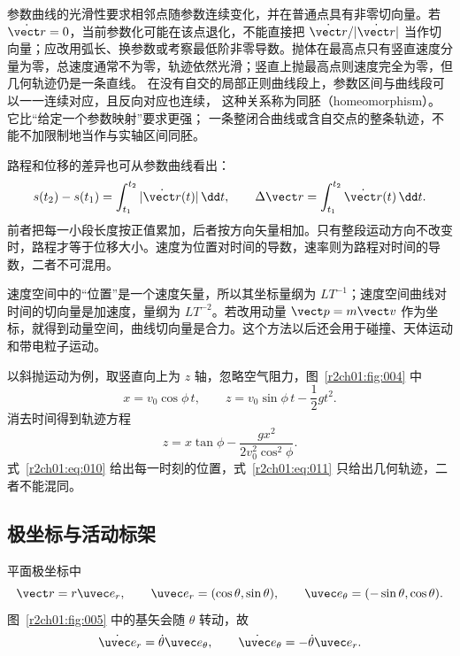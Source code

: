 参数曲线的光滑性要求相邻点随参数连续变化，并在普通点具有非零切向量。若 $\dot{\vect r}=0$，当前参数化可能在该点退化，不能直接把 $\dot{\vect r}/|\dot{\vect r}|$ 当作切向量；应改用弧长、换参数或考察最低阶非零导数。抛体在最高点只有竖直速度分量为零，总速度通常不为零，轨迹依然光滑；竖直上抛最高点则速度完全为零，但几何轨迹仍是一条直线。
在没有自交的局部正则曲线段上，参数区间与曲线段可以一一连续对应，且反向对应也连续，
这种关系称为同胚（homeomorphism）。它比“给定一个参数映射”要求更强；
一条整闭合曲线或含自交点的整条轨迹，不能不加限制地当作与实轴区间同胚。

路程和位移的差异也可从参数曲线看出：
\[
  s(t_2)-s(t_1)=\int_{t_1}^{t_2}|\dot{\vect r}(t)|\,\dd t,\qquad
  \Delta\vect r=\int_{t_1}^{t_2}\dot{\vect r}(t)\,\dd t.
\]
前者把每一小段长度按正值累加，后者按方向矢量相加。只有整段运动方向不改变时，路程才等于位移大小。速度为位置对时间的导数，速率则为路程对时间的导数，二者不可混用。

速度空间中的“位置”是一个速度矢量，所以其坐标量纲为 $LT^{-1}$；速度空间曲线对时间的切向量是加速度，量纲为 $LT^{-2}$。若改用动量 $\vect p=m\vect v$ 作为坐标，就得到动量空间，曲线切向量是合力。这个方法以后还会用于碰撞、天体运动和带电粒子运动。

以斜抛运动为例，取竖直向上为 $z$ 轴，忽略空气阻力，图~\ref{r2ch01:fig:004} 中
\begin{equation}
  x=v_0\cos\phi\,t,\qquad
  z=v_0\sin\phi\,t-\frac12gt^2.
  \label{r2ch01:eq:010}
\end{equation}
消去时间得到轨迹方程
\begin{equation}
  z=x\tan\phi-\frac{g x^2}{2v_0^2\cos^2\phi}.
  \label{r2ch01:eq:011}
\end{equation}
式~\eqref{r2ch01:eq:010} 给出每一时刻的位置，式~\eqref{r2ch01:eq:011} 只给出几何轨迹，二者不能混同。

\figProjectile

\subsection{极坐标与活动标架}
\label{r2ch01:sec:polar}

平面极坐标中
\begin{equation}
  \vect r=r\uvec e_r,\qquad
  \uvec e_r=(\cos\theta,\sin\theta),\qquad
  \uvec e_\theta=(-\sin\theta,\cos\theta).
  \label{r2ch01:eq:012}
\end{equation}
图~\ref{r2ch01:fig:005} 中的基矢会随 $\theta$ 转动，故
\begin{equation}
  \dot{\uvec e}_r=\dot\theta\uvec e_\theta,\qquad
  \dot{\uvec e}_\theta=-\dot\theta\uvec e_r.
  \label{r2ch01:eq:013}
\end{equation}

